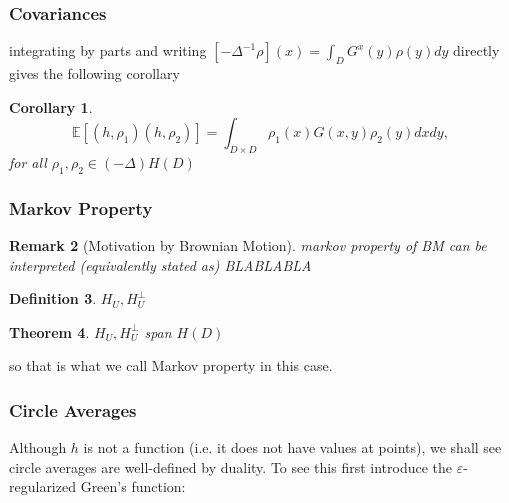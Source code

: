 \documentclass[11pt,reqno]{amsart}
\numberwithin{equation}{section}
\newtheorem{thm}{Theorem}[section]
\newtheorem{lem}[thm]{Lemma}
\newtheorem{cor}[thm]{Corollary}
\newtheorem{defi}[thm]{Definition}
\newtheorem{rem}[thm]{Remark}
\newcommand{\eps}{\varepsilon}
\begin{document}
\subsubsection{Covariances}



integrating by parts and writing $[-\Delta^{-1}\rho](x) = \int_D G^x(y)\rho(y)dy$ directly gives the following corollary

\begin{cor}
	$$\mathbb E[(h,\rho_1) (h,\rho_2)]=\int_{D\times D}\rho_1(x)G(x,y)\rho_2(y)dxdy,$$
for all $\rho_1,\rho_2 \in (-\Delta)H(D)$
\end{cor}

\subsubsection{Markov Property}

\begin{rem}[Motivation by Brownian Motion]
	markov property of BM can be interpreted (equivalently stated as) BLABLABLA
\end{rem}

\begin{defi}
	$H_U, H_U^\perp$
\end{defi}

\begin{thm}\label{thm:MarkovProperty}
	$H_U, H_U^\perp$ span $H(D)$
\end{thm}

so that is what we call Markov property in this case.


\subsubsection{Circle Averages}

Although $h$ is not a function (i.e. it does not have values at points), we shall see circle averages are well-defined by duality. To see this first introduce the $\eps$-regularized Green's function:
\end{document}
